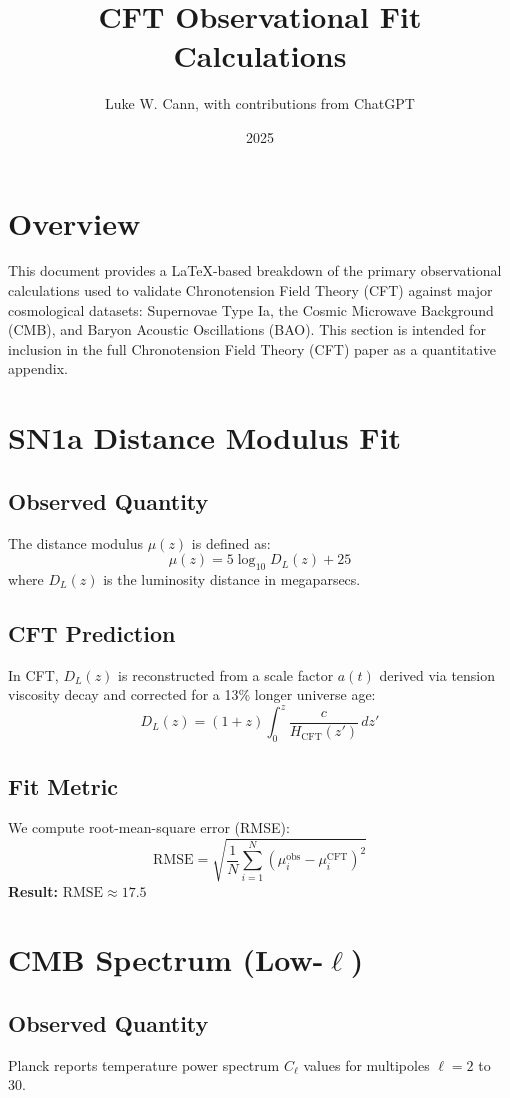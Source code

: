 \documentclass{article}
\title{CFT Observational Fit Calculations}
\author{Luke W. Cann, with contributions from ChatGPT}
\date{2025}
\begin{document}
\maketitle

\section*{Overview}
This document provides a LaTeX-based breakdown of the primary observational calculations used to validate Chronotension Field Theory (CFT) against major cosmological datasets: Supernovae Type Ia, the Cosmic Microwave Background (CMB), and Baryon Acoustic Oscillations (BAO). This section is intended for inclusion in the full Chronotension Field Theory (CFT) paper as a quantitative appendix.

\section{SN1a Distance Modulus Fit}

\subsection{Observed Quantity}
The distance modulus \( \mu(z) \) is defined as:
\[ \mu(z) = 5 \log_{10} D_L(z) + 25 \]
where \( D_L(z) \) is the luminosity distance in megaparsecs.

\subsection{CFT Prediction}
In CFT, \( D_L(z) \) is reconstructed from a scale factor \( a(t) \) derived via tension viscosity decay and corrected for a 13\% longer universe age:
\[
D_L(z) = (1 + z) \int_0^z \frac{c}{H_{\text{CFT}}(z')} \, dz'
\]

\subsection{Fit Metric}
We compute root-mean-square error (RMSE):
\[
\text{RMSE} = \sqrt{\frac{1}{N} \sum_{i=1}^N (\mu_i^{\text{obs}} - \mu_i^{\text{CFT}})^2}
\]
\textbf{Result:} \( \text{RMSE} \approx 17.5 \)

\section{CMB Spectrum (Low-\( \ell \))}

\subsection{Observed Quantity}
Planck reports temperature power spectrum \( C_\ell \) values for multipoles \( \ell = 2 \) to 30.
\end{document}
